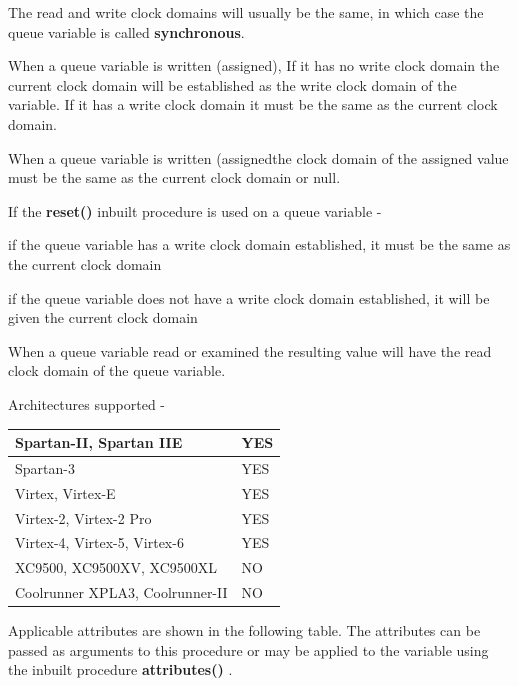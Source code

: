         The read and write clock domains will usually be the same, in which case
        the queue variable is called {\bf synchronous}.
        
        When a queue variable is written (assigned), If it has no write clock
        domain the current clock domain will be established as the write clock
        domain of the variable. If it has a write clock domain it must be the
        same as the current clock domain.
        
        When a queue variable is written (assignedthe clock domain of
        the assigned value must be the same as the current clock domain or null.
        
        If the {\bf reset()} inbuilt procedure is used on a queue variable -
        \blist
        \item   if the queue variable has a write clock domain established, it
                must be the same as the current clock domain
        \item   if the queue variable does not have a write clock domain established,
                it will be given the current clock domain
        \blend
        
        When a queue variable read or examined the resulting value will have the
        read clock domain of the queue variable.
        
        Architectures supported -

        \begin{tabular}{| l | l |} \hline
        Spartan-II, Spartan IIE         & YES   \\ \hline
        Spartan-3                       & YES   \\ \hline
        Virtex, Virtex-E                & YES   \\ \hline
        Virtex-2, Virtex-2 Pro          & YES   \\ \hline
        Virtex-4, Virtex-5, Virtex-6    & YES   \\ \hline
        XC9500, XC9500XV, XC9500XL      & NO    \\ \hline
        Coolrunner XPLA3, Coolrunner-II & NO    \\ \hline
        \end{tabular}
        
        Applicable attributes are shown in the following table. The
        attributes can be passed as arguments to this procedure or may be
        applied to the variable using the inbuilt procedure
        {\bf attributes()} .
        
